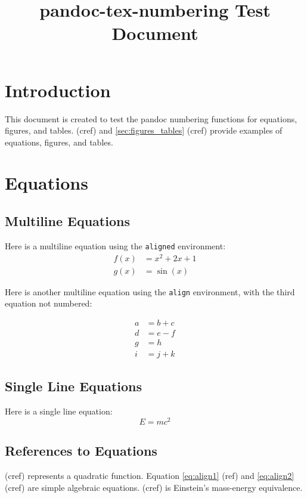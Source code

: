 \documentclass{article}
\title{pandoc-tex-numbering Test Document}
\begin{document}
\maketitle
\section{Introduction}
This document is created to test the pandoc numbering functions for equations, figures, and tables.  (cref) and \cref{sec:figures_tables} (cref) provide examples of equations, figures, and tables.

\section{Equations}

\subsection{Multiline Equations\label{sec:equations}}
Here is a multiline equation using the \texttt{aligned} environment:
\begin{equation}
    \begin{aligned}
        f(x) &= x^2 + 2x + 1 \\
        g(x) &= \sin(x)
    \end{aligned}
    \label{eq:quadratic}
\end{equation}

Here is another multiline equation using the \texttt{align} environment, with the third equation not numbered:

\begin{align}
    a &= b + c \label{eq:align1} \\
    d &= e - f \label{eq:align2} \\
    g &= h \nonumber \\
    i &= j + k \label{eq:align3}
\end{align}

\subsection{Single Line Equations}
Here is a single line equation:
\begin{equation}
    E = mc^2 \label{eq:einstein}
\end{equation}

\subsection{References to Equations}
 (cref) represents a quadratic function. Equation \ref{eq:align1} (ref) and \cref{eq:align2} (cref) are simple algebraic equations.  (cref) is Einstein's mass-energy equivalence. 
\end{document}
